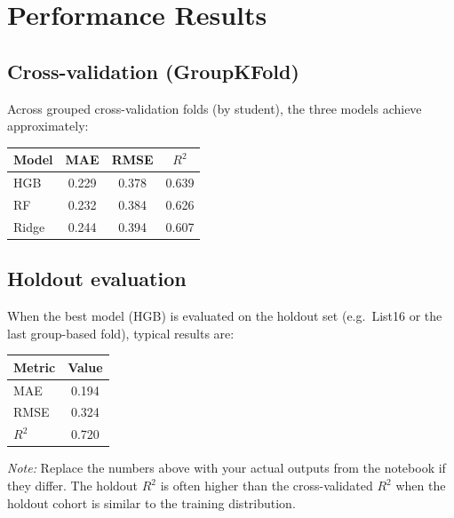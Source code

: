 \documentclass[12pt,a4paper]{article}
\begin{document}
\section{Performance Results}

\subsection{Cross-validation (GroupKFold)}

Across grouped cross-validation folds (by student), the three models achieve approximately:

\begin{center}
\begin{tabular}{lccc}
\toprule
Model & MAE & RMSE & \(R^2\) \\
\midrule
HGB  & 0.229 & 0.378 & 0.639 \\
RF   & 0.232 & 0.384 & 0.626 \\
Ridge & 0.244 & 0.394 & 0.607 \\
\bottomrule
\end{tabular}
\end{center}

\subsection{Holdout evaluation}

When the best model (HGB) is evaluated on the holdout set (e.g.\ List16 or the last group-based fold), typical results are:

\begin{center}
\begin{tabular}{lc}
\toprule
Metric & Value \\
\midrule
MAE   & 0.194 \\
RMSE  & 0.324 \\
\(R^2\) & 0.720 \\
\bottomrule
\end{tabular}
\end{center}

\emph{Note:} Replace the numbers above with your actual outputs from the notebook if they differ. The holdout \(R^2\) is often higher than the cross-validated \(R^2\) when the holdout cohort is similar to the training distribution.

\end{document}
